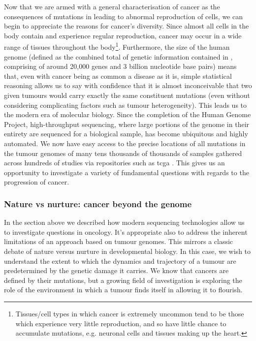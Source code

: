 \documentclass[thesis.tex]{subfiles}
\begin{document}
Now that we are armed with a general characterisation of cancer as the consequences of mutations in  leading to abnormal reproduction of cells, we can begin to appreciate the reasons for cancer's diversity. Since almost all cells in the body contain  and experience regular reproduction, cancer may occur in a wide range of tissues throughout the body\footnote{Tissues/cell types in which cancer is extremely uncommon tend to be those which experience very little reproduction, and so have little chance to accumulate mutations, e.g. neuronal cells and tissues making up the heart.}. Furthermore, the size of the human genome (defined as the combined total of genetic information contained in , comprising of around 20,000 genes and 3 billion nucleotide base pairs) means that, even with cancer being as common a disease as it is, simple statistical reasoning allows us to say with confidence that it is almost inconceivable that two given tumours would carry exactly the same constituent mutations (even without considering complicating factors such as tumour heterogeneity). This leads us to the modern era of molecular biology. Since the completion of the Human Genome Project, high-throughput sequencing, where large portions of the genome in their entirety are sequenced for a biological sample, has become ubiquitous and highly automated. We now have easy access to the precise locations of all mutations in the tumour genomes of many tens thousands of thousands of samples gathered across hundreds of studies via repositories such as \gls{tcga} \citep{weinstein_cancer_2013}. This gives us an opportunity to investigate a variety of fundamental questions with regards to the progression of cancer. 

\subsubsection{Nature vs nurture: cancer beyond the genome}
In the section above we described how modern sequencing technologies allow us to investigate questions in oncology. It's appropriate also to address the inherent limitations of an approach based on tumour genomes. This mirrors a classic debate of nature versus nurture in developmental biology. In this case, we wish to understand the extent to which the dynamics and trajectory of a tumour are predetermined by the genetic damage it carries. We know that cancers are defined by their mutations, but a growing field of investigation is exploring the role of the environment in which a tumour finds itself in allowing it to flourish. 
\end{document}
